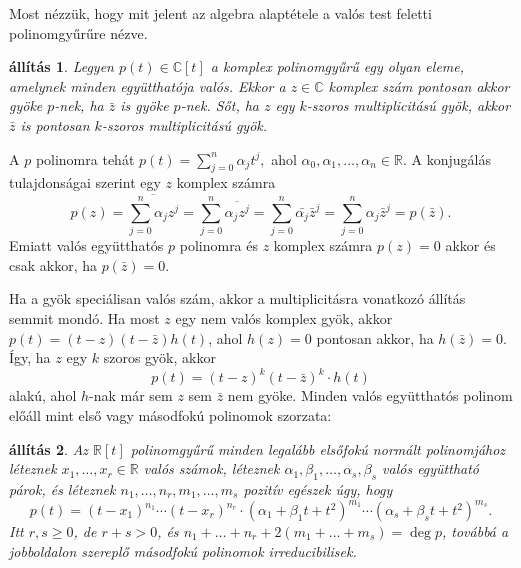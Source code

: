\documentclass[a4paper, showtrims]{memoir}
\makeatletter
\renewenvironment{proof}[1][\proofname]
    {\par\pushQED{\qed}%
    \normalfont \topsep6\p@\@plus6\p@\relax
    \trivlist
    \item[\hskip\labelsep
        \itshape
    #1\@addpunct{:}]\ignorespaces}
    {\popQED\endtrivlist\@endpefalse}
\theoremstyle{plain}
\newtheorem{proposition}{állítás}[chapter]
\theoremstyle{remark}
\theoremstyle{definition}
\makeatother
\begin{document}
Most nézzük, hogy mit jelent az algebra alaptétele a valós test feletti polinomgyűrűre nézve.
\begin{proposition}
	Legyen $p\left( t \right)\in\mathbb{C}[t]$ a komplex polinomgyűrű egy olyan eleme,
	amelynek minden együtthatója valós.
	Ekkor a $z\in \mathbb{C}$ komplex szám pontosan akkor gyöke $p$-nek,
	ha $\bar{z}$ is gyöke $p$-nek.
	Sőt, ha $z$ egy $k$-szoros multiplicitású gyök,
	akkor $\bar{z}$ is pontosan $k$-szoros multiplicitású gyök.
\end{proposition}
\begin{proof}
	A $p$ polinomra tehát
	\begin{math}
		p\left( t \right)
		=
		\sum_{j=0}^n\alpha_jt^j,
	\end{math}
	ahol $\alpha_0,\alpha_1,\ldots,\alpha_n\in\mathbb{R}$.
	A konjugálás tulajdonságai szerint egy $z$ komplex számra
	\[
		p\left( z \right)=
		\overline{
			\sum_{j=0}^n\alpha_jz^j
		}
		=
		\sum_{j=0}^n\overline{\alpha_jz^j}
		=
		\sum_{j=0}^n\bar{\alpha_j}\bar{z}^j
		=
		\sum_{j=0}^n\alpha_j\bar{z}^j
		=
		p\left(\bar{z} \right).
	\]
	Emiatt valós együtthatós $p$ polinomra és $z$ komplex számra
	$p\left( z \right)=0$ akkor és csak akkor, ha $p\left( \bar{z} \right)=0.$

	Ha a gyök speciálisan valós szám, akkor a multiplicitásra vonatkozó állítás semmit mondó.
	Ha most $z$ egy nem valós komplex gyök,
	akkor $p(t)=\left( t-z \right)\left( t-\bar{z} \right)h\left( t \right)$, ahol
	$h\left( z \right)=0$ pontosan akkor, ha $h\left( \bar{z} \right)=0$.
	Így, ha $z$ egy $k$ szoros gyök,
	akkor
	\[
		p\left( t \right)=\left( t-z \right)^{k}\left( t-\bar{z} \right)^{k}\cdot h\left( t \right)
	\]
	alakú, ahol $h$-nak már sem $z$ sem $\bar{z}$ nem gyöke.
\end{proof}
Minden valós együtthatós polinom előáll mint első vagy másodfokú polinomok szorzata:
\begin{proposition}\label{pr:RealPolFact}
	Az $\mathbb{R}[t]$ polinomgyűrű minden legalább elsőfokú normált polinomjához
	léteznek $x_1,\ldots,x_r\in\mathbb{R}$ valós számok,
	léteznek $\alpha_1,\beta_1,\ldots,\alpha_s,\beta_s$ valós együttható párok,
	és léteznek
	$n_1,\ldots,n_r, m_1,\ldots,m_s$ pozitív egészek úgy, hogy
	\[
		p\left( t \right)
		=
		\left( t-x_1 \right)^{n_1}
		\cdots
		\left( t-x_r \right)^{n_r}
		\cdot
		\left(\alpha_1 + \beta_1t +t^2\right)^{m_1}
		\cdots
		\left(\alpha_s + \beta_st +t^2\right)^{m_s}.
	\]
	Itt $r,s\geq 0$, de $r+s>0$, és $n_1+\dots+n_r+2\left( m_1+\dots+m_s \right)=\deg p$,
	továbbá a jobboldalon szereplő másodfokú polinomok irreducibilisek.
\end{proposition}
\end{document}

